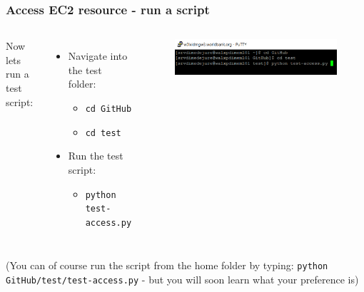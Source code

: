 \documentclass[aspectratio=169]{beamer} %
\begin{document}
\begin{frame}
	\frametitle{Access EC2 resource - run a script}
	\vspace{1cm}
	\begin{columns}[c]
		Now lets run a test script:
		\begin{itemize}
			\item Navigate into the test folder:
			\begin{itemize}
				\item \texttt{cd GitHub}
				\item \texttt{cd test}
			\end{itemize}
			\item Run the test script:
			\begin{itemize}
				\item \texttt{python test-access.py}
			\end{itemize}
		\end{itemize}

		\begin{figure}
			\centering
			\includegraphics[width=\textwidth]{./img/access-5.png}
		\end{figure}

	\end{columns}

	\vspace{1cm}
	\small (You can of course run the script from the home folder by typing: \newline
	\texttt{python GitHub/test/test-access.py}
	- but you will soon learn what your preference is)

\end{frame}
\end{document}
